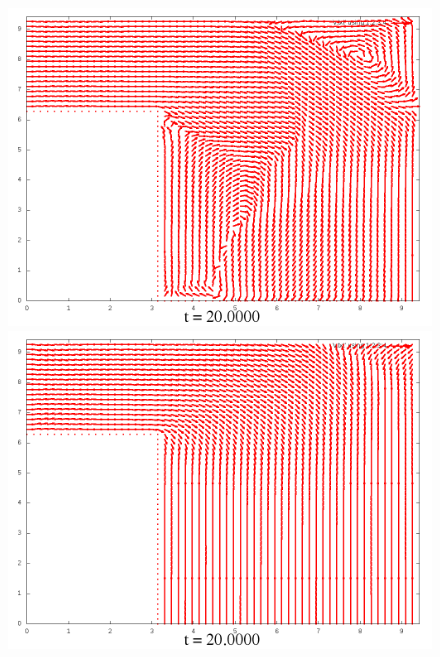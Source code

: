 \documentclass[a4paper, 12pt]{article}
\begin{document}
\begin{figure}[h]
\begin{minipage}[h]{0.4\linewidth}
	\includegraphics[width=1\linewidth]{./img/01_1_1/V/100}
\end{minipage}
\hfill
\begin{minipage}[h]{0.4\linewidth}
	\includegraphics[width=1\linewidth]{./img/01_1_01/V/100}
\end{minipage}
\end{figure}
\end{document}

